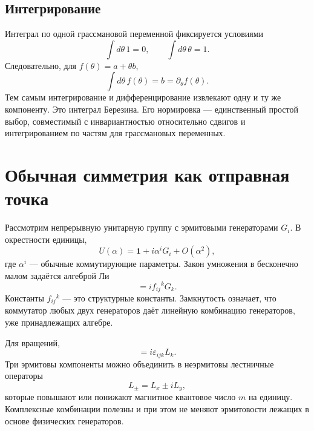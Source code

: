 \subsection{Интегрирование}

Интеграл по одной грассмановой переменной фиксируется условиями
\begin{equation}
\int d\theta\,1=0,
\qquad
\int d\theta\,\theta=1.
\end{equation}
Следовательно, для \(f(\theta)=a+\theta b\),
\begin{equation}
\int d\theta\,f(\theta)=b=\partial_\theta f(\theta).
\end{equation}
Тем самым интегрирование и дифференцирование извлекают одну и ту же компоненту. Это интеграл Березина. Его нормировка — единственный простой выбор, совместимый с инвариантностью относительно сдвигов и интегрированием по частям для грассмановых переменных. 

\section{Обычная симметрия как отправная точка}

Рассмотрим непрерывную унитарную группу с эрмитовыми генераторами \(G_i\). В окрестности единицы,
\begin{equation}
U(\alpha)=\mathbf 1+i\alpha^iG_i+O(\alpha^2),
\end{equation}
где \(\alpha^i\) — обычные коммутирующие параметры. Закон умножения в бесконечно малом задаётся алгеброй Ли
\begin{equation}
[G_i,G_j]=i f_{ij}{}^{k}G_k.
\end{equation}
Константы \(f_{ij}{}^k\) — это структурные константы. Замкнутость означает, что коммутатор любых двух генераторов даёт линейную комбинацию генераторов, уже принадлежащих алгебре.

Для вращений,
\begin{equation}
[L_i,L_j]=i\varepsilon_{ijk}L_k.
\end{equation}
Три эрмитовы компоненты можно объединить в неэрмитовы лестничные операторы
\begin{equation}
L_\pm=L_x\pm iL_y,
\end{equation}
которые повышают или понижают магнитное квантовое число \(m\) на единицу. Комплексные комбинации полезны и при этом не меняют эрмитовости лежащих в основе физических генераторов.

